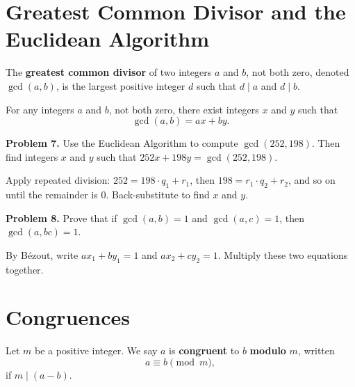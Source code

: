 \answerspace[2.5in]

\section{Greatest Common Divisor and the Euclidean Algorithm}

\begin{defbox}
The \textbf{greatest common divisor} of two integers $a$ and $b$, not both
zero, denoted $\gcd(a,b)$, is the largest positive integer $d$ such that
$d \mid a$ and $d \mid b$.
\end{defbox}

\begin{defbox}
For any integers $a$ and $b$, not both zero, there exist integers $x$ and
$y$ such that
\[
  \gcd(a,b) = ax + by.
\]
\end{defbox}

\bigskip

\textbf{Problem 7.}\;
Use the Euclidean Algorithm to compute $\gcd(252, 198)$.
Then find integers $x$ and $y$ such that $252x + 198y = \gcd(252, 198)$.

\begin{hintbox}
Apply repeated division:
$252 = 198 \cdot q_1 + r_1$, then $198 = r_1 \cdot q_2 + r_2$, and so on
until the remainder is $0$.  Back-substitute to find $x$ and $y$.
\end{hintbox}

\answerspace[2.8in]

\textbf{Problem 8.}\;
Prove that if $\gcd(a, b) = 1$ and $\gcd(a, c) = 1$, then $\gcd(a, bc) = 1$.

\begin{hintbox}
By B\'ezout, write $ax_1 + by_1 = 1$ and $ax_2 + cy_2 = 1$.
Multiply these two equations together.
\end{hintbox}

\answerspace[2.2in]

\section{Congruences}

\begin{defbox}
Let $m$ be a positive integer.  We say $a$ is \textbf{congruent} to $b$
\textbf{modulo} $m$, written
\[
  a \equiv b \pmod{m},
\]
if $m \mid (a - b)$.
\end{defbox}

